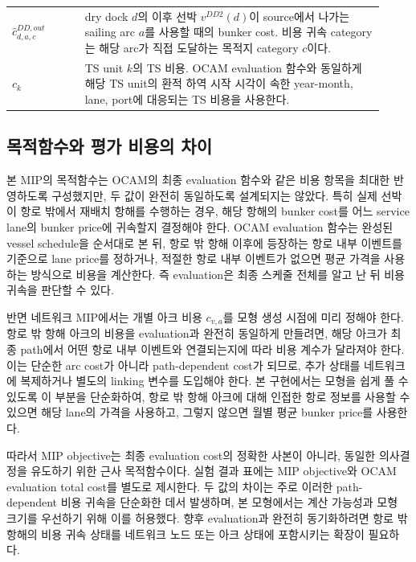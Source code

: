 \documentclass[11pt]{article}
\begin{document}
\begin{longtable}{@{}p{0.18\linewidth}p{0.74\linewidth}@{}}
$\hat c^{DD,out}_{d,a,c}$ & dry dock $d$의 이후 선박 $v^{DD2}(d)$이 source에서 나가는 sailing arc $a$를 사용할 때의 bunker cost. 비용 귀속 category는 해당 arc가 직접 도달하는 목적지 category $c$이다. \\
$c_k$ & TS unit $k$의 TS 비용. OCAM evaluation 함수와 동일하게 해당 TS unit의 환적 하역 시작 시각이 속한 year-month, lane, port에 대응되는 TS 비용을 사용한다. \\
\bottomrule
\end{longtable}

\subsection{목적함수와 평가 비용의 차이}

본 MIP의 목적함수는 OCAM의 최종 evaluation 함수와 같은 비용 항목을 최대한
반영하도록 구성했지만, 두 값이 완전히 동일하도록 설계되지는 않았다. 특히 실제
선박이 항로 밖에서 재배치 항해를 수행하는 경우, 해당 항해의 bunker cost를 어느
service lane의 bunker price에 귀속할지 결정해야 한다. OCAM evaluation 함수는
완성된 vessel schedule을 순서대로 본 뒤, 항로 밖 항해 이후에 등장하는 항로 내부
이벤트를 기준으로 lane price를 정하거나, 적절한 항로 내부 이벤트가 없으면 평균
가격을 사용하는 방식으로 비용을 계산한다. 즉 evaluation은 최종 스케줄 전체를
알고 난 뒤 비용 귀속을 판단할 수 있다.

반면 네트워크 MIP에서는 개별 아크 비용 $c_{v,a}$를 모형 생성 시점에 미리
정해야 한다. 항로 밖 항해 아크의 비용을 evaluation과 완전히 동일하게 만들려면,
해당 아크가 최종 path에서 어떤 항로 내부 이벤트와 연결되는지에 따라 비용 계수가
달라져야 한다. 이는 단순한 arc cost가 아니라 path-dependent cost가 되므로, 추가
상태를 네트워크에 복제하거나 별도의 linking 변수를 도입해야 한다. 본 구현에서는
모형을 쉽게 풀 수 있도록 이 부분을 단순화하여, 항로 밖 항해 아크에 대해 인접한
항로 정보를 사용할 수 있으면 해당 lane의 가격을 사용하고, 그렇지 않으면 월별
평균 bunker price를 사용한다.

따라서 MIP objective는 최종 evaluation cost의 정확한 사본이 아니라, 동일한
의사결정을 유도하기 위한 근사 목적함수이다. 실험 결과 표에는 MIP objective와
OCAM evaluation total cost를 별도로 제시한다. 두 값의 차이는 주로 이러한
path-dependent 비용 귀속을 단순화한 데서 발생하며, 본 모형에서는 계산 가능성과
모형 크기를 우선하기 위해 이를 허용했다. 향후 evaluation과 완전히 동기화하려면
항로 밖 항해의 비용 귀속 상태를 네트워크 노드 또는 아크 상태에 포함시키는 확장이
필요하다.
\end{document}
